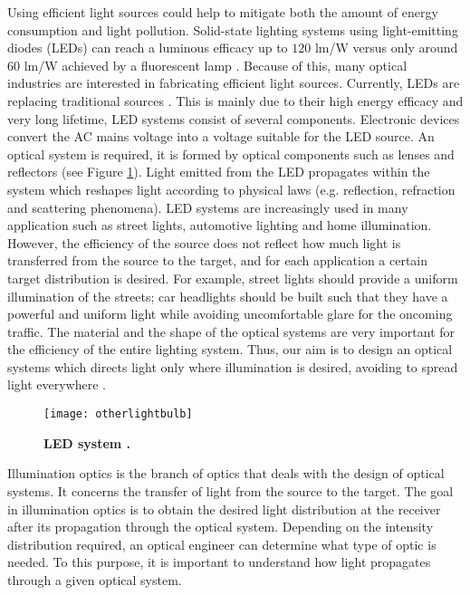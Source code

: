 Using efficient light sources could help to mitigate both the amount of energy consumption and light pollution. %
Solid-state lighting systems using light-emitting diodes (LEDs) can reach a luminous efficacy up to $120$ \textrm{lm}/\textrm{W} versus only around $60$ \textrm{lm}/\textrm{W} achieved by a fluorescent lamp \cite{bergesen2016potential, humphreys2008solid}.
Because of this, many optical industries are interested in fabricating efficient light sources.
Currently, LEDs are replacing traditional sources \cite{koshel2012illumination}. 
This is mainly due to their high energy efficacy and very long lifetime, 
LED systems consist of several components. 
Electronic devices convert the AC mains voltage into a voltage suitable for the LED source.
An optical system is required, it is formed by optical components such as lenses and reflectors \cite{moreno2008modeling} (see Figure \ref{fig:led}). Light emitted from the LED propagates within the system which reshapes light according to physical laws (e.g. reflection, refraction and scattering phenomena). LED systems are increasingly used in many application such as street lights, automotive lighting and home illumination. 
However, the efficiency of the source does not reflect how much light is transferred from the source to the target, and for each application a certain target distribution is desired. For example, street lights should provide a uniform illumination of the streets; car headlights should be built such that they have a powerful and uniform light while avoiding uncomfortable glare for the oncoming traffic. The material and the shape of the optical systems are very important for the efficiency of the entire lighting system. Thus, our aim is to design an optical systems which directs light only where illumination is desired, avoiding to spread light everywhere \cite{taguchi2008present, haitz2011solid}. 
\begin{figure}[h]
\centering
  \begin{minipage}[t]{0.5\textwidth}
    \texttt{[image: otherlightbulb]}
    \caption{\textbf{LED system \cite{Schweber}.}}
    \label{fig:led}
\end{minipage}
\end{figure}

Illumination optics is the branch of optics that deals with the design of optical systems. It concerns the transfer of light from the source to the target. The goal in illumination optics is to obtain the desired light distribution at the receiver after its propagation through the optical system. Depending on the intensity distribution required, an optical engineer can determine what type of optic is needed. To this purpose, it is important to understand how light propagates through a given optical system.

